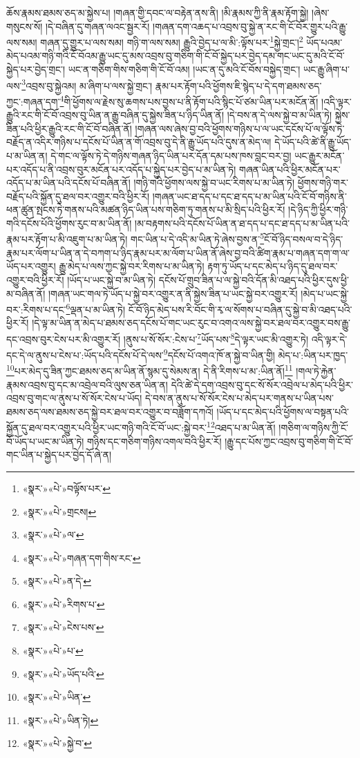 ཆོས་རྣམས་ཐམས་ཅད་མ་སྐྱེས་པ། །གཞན་གྱི་དབང་ལ་བརྟེན་ནས་ནི། །མི་རྣམས་ཀྱི་ནི་རྣམ་རྟོག་སྐྱེ། །ཞེས་གསུངས་སོ། །དེ་བཞིན་དུ་གཞན་ལའང་སྦྱར་རོ། །གཞན་དག་འཆད་པ་འབྲས་བུ་སྐྱེ་ན་རང་གི་ངོ་བོར་གྱུར་པའི་རྒྱུ་ལས་སམ། གཞན་དུ་གྱུར་པ་ལས་སམ། གཉི་ག་ལས་སམ། རྒྱུའི་བྱེད་པ་ལ་མི་:ལྟོས་པར་\footnote{«སྣར་»«པེ་»བལྟོས་པར་}སྐྱེ་གྲང་།\footnote{«སྣར་»«པེ་»གྲངས།} ཡོད་པའམ་མེད་པའམ་གཉི་གའི་ངོ་བོའམ་རྒྱུ་ཡང་དུ་མས་འབྲས་བུ་གཅིག་གི་ངོ་བོ་སྐྱེད་པར་བྱེད་དམ་གང་ཡང་དུ་མའི་ངོ་བོ་སྐྱེད་པར་བྱེད་གྲང་། ཡང་ན་གཅིག་གིས་གཅིག་གི་ངོ་བོ་འམ། །ཡང་ན་དུ་མའི་ངོ་བོས་བསྐྱེད་གྲང་། ཡང་རྒྱུ་ཞིག་པ་ལས་\footnote{«སྣར་»«པེ་»ལ་}འབྲས་བུ་སྐྱེའམ། མ་ཞིག་པ་ལས་སྐྱེ་གྲང་། རྣམ་པར་རྟོག་པའི་ཕྱོགས་ཇི་སྙེད་པ་དེ་དག་ཐམས་ཅད་ཀྱང་:གཞན་དག་\footnote{«སྣར་»«པེ་»གཞན་དག་གིས་རང་}གི་ཕྱོགས་ལ་རྗེས་སུ་ཆགས་པས་བྱས་པ་ནི་རྟོག་པའི་སྙིང་པོ་ཙམ་ཡིན་པར་མངོན་ནོ། །འདི་ལྟར་རྒྱུའི་རང་གི་ངོ་བོ་འབྲས་བུ་ཡིན་ན་རྒྱུ་བཞིན་དུ་སྐྱེས་ཟིན་པ་ཉིད་ཡིན་ནོ། །དེ་བས་ན་དེ་ལས་སྐྱེ་བ་མ་ཡིན་ཏེ། སྐྱེས་ཟིན་པའི་ཕྱིར་རྒྱུའི་རང་གི་ངོ་བོ་བཞིན་ནོ། །གཞན་ལས་ཞེས་བྱ་བའི་ཕྱོགས་གཉིས་པ་ལ་ཡང་དངོས་པོ་ལ་ལྟོས་ཏེ་བརྗོད་ན་འདིར་གཉིས་པ་དངོས་པོ་ཡིན་ན་གོ་འབྲས་བུ་དེ་ནི་རྒྱུ་ཡོད་པའི་དུས་ན་མེད་ལ། དེ་ཡོད་པའི་ཚེ་ནི་རྒྱུ་ཡོད་པ་མ་ཡིན་ན། དེ་གང་ལ་ལྟོས་ཏེ་དེ་གཉིས་གཞན་ཉིད་ཡིན་པར་དོན་དམ་པས་ཁས་བླང་བར་བྱ། ཡང་རྒྱུར་མངོན་པར་འདོད་པ་ནི་འབྲས་བུར་མངོན་པར་འདོད་པ་སྐྱེད་པར་བྱེད་པ་མ་ཡིན་ཏེ། གཞན་ཡིན་པའི་ཕྱིར་མངོན་པར་འདོད་པ་མ་ཡིན་པའི་དངོས་པོ་བཞིན་ནོ། །གཉི་གའི་ཕྱོགས་ལས་སྐྱེ་བ་ཡང་རིགས་པ་མ་ཡིན་ཏེ། ཕྱོགས་གཉི་གར་བརྗོད་པའི་སྐྱོན་དུ་ཐལ་བར་འགྱུར་བའི་ཕྱིར་རོ། །གཞན་ཡང་ཐ་དད་པ་དང་ཐ་དད་པ་མ་ཡིན་པའི་ངོ་བོ་གཉིས་ནི་ཕན་ཚུན་སྤངས་ཏེ་གནས་པའི་མཚན་ཉིད་ཡིན་པས་གཅིག་ཏུ་གནས་པ་མི་སྲིད་པའི་ཕྱིར་རོ། །དེ་ཉིད་ཀྱི་ཕྱིར་གཉི་གའི་དངོས་པོའི་ཕྱོགས་རུང་བ་མ་ཡིན་ནོ། །མ་བརྟགས་པའི་དངོས་པོ་ཡིན་ན་ཐ་དད་པ་དང་ཐ་དད་པ་མ་ཡིན་པའི་རྣམ་པར་རྟོག་པ་མི་འཇུག་པ་མ་ཡིན་ཏེ། གང་ཡིན་པ་དེ་འདི་མ་ཡིན་ཏེ་ཞེས་བྱས་ན་\footnote{«སྣར་»«པེ་»ན་དེ་}ངོ་བོ་ཉིད་བསལ་བ་དེ་ཉིད་རྣམ་པར་ལོག་པ་ཡིན་ན་དེ་བཀག་པ་ཉིད་རྣམ་པར་མ་ལོག་པ་ཡིན་ནོ་ཞེས་བྱ་བའི་ཚིག་རྣམ་པ་གཞན་དག་ག་ལ་ཡོད་པར་འགྱུར། རྒྱུ་མེད་པ་ལས་ཀྱང་སྐྱེ་བར་རིགས་པ་མ་ཡིན་ཏེ། རྟག་ཏུ་ཡོད་པ་དང་མེད་པ་ཉིད་དུ་ཐལ་བར་འགྱུར་བའི་ཕྱིར་རོ། །ཡོད་པ་ཡང་སྐྱེ་བ་མ་ཡིན་ཏེ། དངོས་པོ་གྲུབ་ཟིན་པ་ལ་སྐྱེ་བའི་དོན་མི་འཐད་པའི་ཕྱིར་དུས་ཕྱི་མ་བཞིན་ནོ། །གཞན་ཡང་གལ་ཏེ་ཡོད་པ་སྐྱེ་བར་འགྱུར་ན་ནི་སྐྱེས་ཟིན་པ་ཡང་སྐྱེ་བར་འགྱུར་རོ། །མེད་པ་ཡང་སྐྱེ་བར་:རིགས་པ་དང་\footnote{«སྣར་»«པེ་»རིགས་པ་}ལྡན་པ་མ་ཡིན་ཏེ། ངོ་བོ་ཉིད་མེད་པས་རི་བོང་གི་རྭ་ལ་སོགས་པ་བཞིན་དུ་སྐྱེ་བ་མི་འཐད་པའི་ཕྱིར་རོ། །དེ་ལྟ་མ་ཡིན་ན་མེད་པ་ཐམས་ཅད་དངོས་པོ་གང་ཡང་རུང་བ་འགའ་ལས་སྐྱེ་བར་ཐལ་བར་འགྱུར་བས་རྒྱུ་དང་འབྲས་བུར་ངེས་པར་མི་འགྱུར་རོ། །ནུས་པ་སོ་སོར་:ངེས་པ་\footnote{«སྣར་»«པེ་»ངེས་པས་}ཡོད་པས་\footnote{«སྣར་»«པེ་»པ་}དེ་ལྟར་ཡང་མི་འགྱུར་ཏེ། འདི་ལྟར་དེ་དང་དེ་ལ་ནུས་པ་ངེས་པ་:ཡོད་པའི་དངོས་པོ་དེ་ལས་\footnote{«སྣར་»«པེ་»ཡོད་པའི་}དངོས་པོ་འགའ་ཁོ་ན་སྐྱེ་བ་ཡིན་གྱི། མེད་པ་:ཡིན་པར་ཁྱད་\footnote{«སྣར་»«པེ་»ཡིན་}པར་མེད་དུ་ཟིན་ཀྱང་ཐམས་ཅད་མ་ཡིན་ནོ་སྙམ་དུ་སེམས་ན། དེ་ནི་རིགས་པ་མ་:ཡིན་ནོ།\footnote{«སྣར་»«པེ་»ཡིན་ཏེ།} །གལ་ཏེ་རྐྱེན་རྣམས་འབྲས་བུ་དང་མ་འབྲེལ་བའི་ལུས་ཅན་ཡིན་ན། དེའི་ཚེ་དེ་དག་འབྲས་བུ་དང་སོ་སོར་འབྲེལ་པ་མེད་པའི་ཕྱིར་འབྲས་བུ་གང་ལ་ནུས་པ་སོ་སོར་ངེས་པ་ཡོད། དེ་བས་ན་ནུས་པ་སོ་སོར་ངེས་པ་མེད་པར་གནས་པ་ཡིན་པས་ཐམས་ཅད་ལས་ཐམས་ཅད་སྐྱེ་བར་ཐལ་བར་འགྱུར་བ་བཟློག་དཀའོ། །ཡོད་པ་དང་མེད་པའི་ཕྱོགས་ལ་བསྟན་པའི་སྐྱོན་དུ་ཐལ་བར་འགྱུར་པའི་ཕྱིར་ཡང་གཉི་གའི་ངོ་བོ་ཡང་:སྐྱེ་བར་\footnote{«སྣར་»«པེ་»སྐྱེ་བ་}འཐད་པ་མ་ཡིན་ནོ། །གཅིག་ལ་གཉིས་ཀྱི་ངོ་བོ་ཡོད་པ་ཡང་མ་ཡིན་ཏེ། གཉིས་དང་གཅིག་གཉིས་འགལ་བའི་ཕྱིར་རོ། །རྒྱུ་དང་པོས་ཀྱང་འབྲས་བུ་གཅིག་གི་ངོ་བོ་གང་ཡིན་པ་སྐྱེད་པར་བྱེད་དོ་ཞེ་ན། 